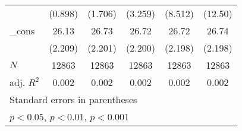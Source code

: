 {\begin{tabular}{l*{5}{c}}
            &     (0.898)         &     (1.706)         &     (3.259)         &     (8.512)         &     (12.50)         \\
[1em]
\_cons      &       26.13\sym{***}&       26.73\sym{***}&       26.72\sym{***}&       26.72\sym{***}&       26.74\sym{***}\\
            &     (2.209)         &     (2.201)         &     (2.200)         &     (2.198)         &     (2.198)         \\
\hline
\(N\)       &       12863         &       12863         &       12863         &       12863         &       12863         \\
adj. \(R^{2}\)&       0.002         &       0.002         &       0.002         &       0.002         &       0.002         \\
\hline\hline
\multicolumn{6}{l}{\footnotesize Standard errors in parentheses}\\
\multicolumn{6}{l}{\footnotesize \sym{*} \(p<0.05\), \sym{**} \(p<0.01\), \sym{***} \(p<0.001\)}\\
\end{tabular}
}
